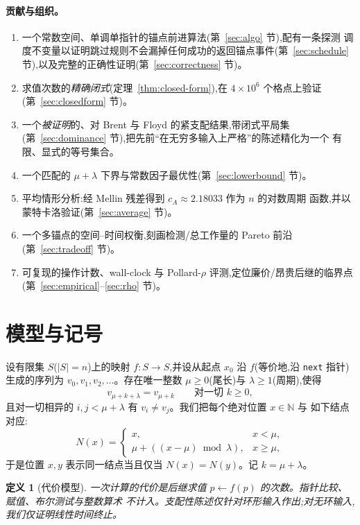 \documentclass[11pt]{ctexart}
\newtheorem{definition}[theorem]{定义}
\newcommand{\nextop}{\texttt{next}}
\begin{document}
\paragraph{贡献与组织。}
\begin{enumerate}[leftmargin=2em,itemsep=2pt]
    \item 一个常数空间、单调单指针的锚点前进算法(第~\ref{sec:algo} 节),配有一条探测
          调度不变量以证明跳过规则不会漏掉任何成功的返回锚点事件(第~\ref{sec:schedule}
          节),以及完整的正确性证明(第~\ref{sec:correctness} 节)。
    \item 求值次数的\emph{精确闭式}(定理~\ref{thm:closed-form}),在 $4{\times}10^{6}$
          个格点上验证(第~\ref{sec:closedform} 节)。
    \item 一个\emph{被证明}的、对 Brent 与 Floyd 的紧支配结果,带闭式平局集
          (第~\ref{sec:dominance} 节),把先前``在无穷多输入上严格''的陈述精化为一个
          有限、显式的等号集合。
    \item 一个匹配的 $\mu+\lambda$ 下界与常数因子最优性(第~\ref{sec:lowerbound} 节)。
    \item 平均情形分析:经 Mellin 残差得到 $c_A\approx 2.18033$ 作为 $n$ 的对数周期
          函数,并以蒙特卡洛验证(第~\ref{sec:average} 节)。
    \item 一个多锚点的空间--时间权衡,刻画检测/总工作量的 Pareto 前沿
          (第~\ref{sec:tradeoff} 节)。
    \item 可复现的操作计数、wall-clock 与 Pollard-$\rho$ 评测,定位廉价/昂贵后继的临界点
          (第~\ref{sec:empirical}--\ref{sec:rho} 节)。
\end{enumerate}

\section{模型与记号}
\label{sec:model}

设有限集 $S$($|S|=n$)上的映射 $f:S\to S$,并设从起点 $x_0$ 沿 $f$(等价地,沿
\nextop{} 指针)生成的序列为 $v_0,v_1,v_2,\dots$。存在唯一整数 $\mu\ge 0$(尾长)与
$\lambda\ge 1$(周期),使得
\[
v_{\mu+k+\lambda}=v_{\mu+k}\qquad\text{对一切 }k\ge 0,
\]
且对一切相异的 $i,j<\mu+\lambda$ 有 $v_i\ne v_j$。我们把每个绝对位置 $x\in\mathbb N$ 与
如下结点对应:
\[
N(x)=\begin{cases}x,&x<\mu,\\ \mu+((x-\mu)\bmod \lambda),&x\ge \mu,\end{cases}
\]
于是位置 $x,y$ 表示同一结点当且仅当 $N(x)=N(y)$。记 $k=\mu+\lambda$。

\begin{definition}[代价模型]
\label{def:cost}
一次计算的代价是后继求值 $p\leftarrow f(p)$ 的次数。指针比较、赋值、布尔测试与整数算术
不计入。支配性陈述仅针对环形输入作出;对无环输入,我们仅证明线性时间终止。
\end{definition}
\end{document}
